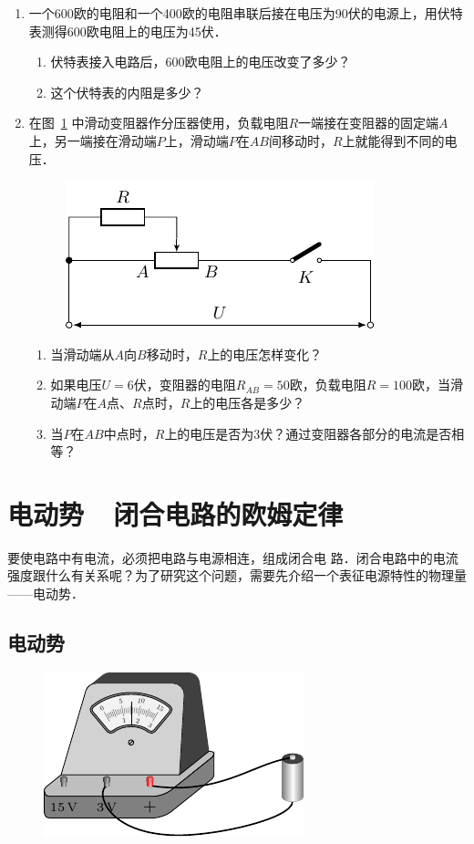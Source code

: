 \begin{enumerate}
    \item 一个600欧的电阻和一个400欧的电阻串联后接在电压为90伏的电源上，用伏特表测得600欧电阻上的电压为45伏．
    \begin{enumerate}
        \item 伏特表接入电路后，600欧电阻上的电压改变了多少？
        \item 这个伏特表的内阻是多少？
    \end{enumerate}
    \item 在图~\ref{fig_B_7-23} 中滑动变阻器作分压器使用，负载电阻$R$一端接在变阻器的固定端$A$上，另一端接在滑动端$P$上，滑动端$P$在$AB$间移动时，$R$上就能得到不同的电压．
    \begin{figure}[htbp]
        \centering
        \includegraphics{fig/B/7-23.pdf}
        \caption{}\label{fig_B_7-23}
    \end{figure}

    \begin{enumerate}
        \item 当滑动端从$A$向$B$移动时，$R$上的电压怎样变化？
        \item 如果电压$U=6$伏，变阻器的电阻$R_{AB}=50$欧，负载电阻$R=100$欧，当滑动端$P$在$A$点、$R$点时，$R$上的电压各是多少？
        \item 当$P$在$AB$中点时，$R$上的电压是否为3伏？通过变阻器各部分的电流是否相等？
    \end{enumerate}
\end{enumerate}

\section{电动势~~闭合电路的欧姆定律}

要使电路中有电流，必须把电路与电源相连，组成闭合电
路．闭合电路中的电流强度跟什么有关系呢？为了研究这个问题，需要先介绍一个表征电源特性的物理量——电动势．

\subsection{电动势}
\begin{figure}[htbp]
    \centering
    \includegraphics{fig/B/7-24.pdf}
    \caption{}\label{fig_B_7-24}
\end{figure}

